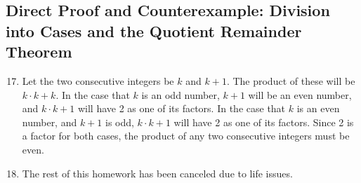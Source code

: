 \documentclass[12pt]{article}
\begin{document}
\subsection{Direct Proof and Counterexample: Division into Cases and the Quotient Remainder Theorem} 
\begin{enumerate}
\setcounter{enumi}{16} %
\item %
Let the two consecutive integers be $k$ and $k + 1$. The product of these will be $k \cdot k + k$.
In the case that $k$ is an odd number, $k + 1$ will be an even number, and $k \cdot k + 1$ will have 2 as one
of its factors.
In the case that $k$ is an even number, and $k + 1$ is odd, $k \cdot k + 1$ will have 2 as one of its factors.
Since 2 is a factor for both cases, the product of any two consecutive integers must be even.
\setcounter{enumi}{18} %
\item The rest of this homework has been canceled due to life issues.%
\end{enumerate}
\end{document}
